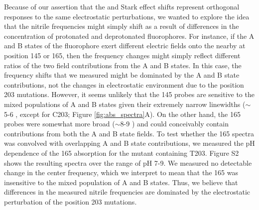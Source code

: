 Because of our assertion that the \pKa{} and Stark effect shifts represent orthogonal responses to the same electrostatic perturbations, we wanted to explore the idea that the nitrile frequencies might simply shift as a result of differences in the concentration of protonated and deprotonated fluorophores.
For instance, if the A and B states of the fluorophore exert different electric fields onto the nearby \pCNF{} at position 145 or 165, then the frequency changes might simply reflect different ratios of the two field contributions from the A and B states.
In this case, the frequency shifts that we measured might be dominated by the A and B state contributions, not the changes in electrostatic environment due to the position 203 mutations.
However, it seems unlikely that the \pCNF{} 145 probes are sensitive to the mixed populations of A and B states given their extremely narrow linewidths ($\sim$5-6 \si{\wn}, except for C203; Figure \ref{fig:abs_spectra}A).
On the other hand, the \pCNF{} 165 probes were somewhat more broad ($\sim$8-9 \si{\wn}) and could conceivably contain contributions from both the A and B state fields.
To test whether the \pCNF{} 165 spectra was convolved with overlapping A and B state contributions, we measured the pH dependence of the \pCNF{} 165 absorption for the mutant containing T203.
Figure S2 shows the resulting spectra over the range of pH 7-9.
We measured no detectable change in the center frequency, which we interpret to mean that the \pCNF{} 165 was insensitive to the mixed population of A and B states.
Thus, we believe that differences in the measured nitrile frequencies are dominated by the electrostatic perturbation of the position 203 mutations. 

